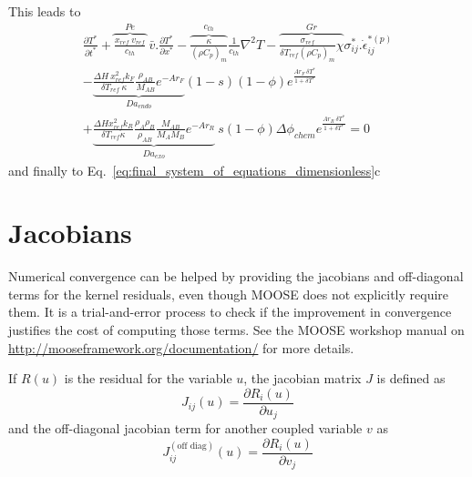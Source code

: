 \documentclass[]{scrreprt}
\newcommand{\moose}{{MOOSE}}
\begin{document}
This leads to 
\begin{multline}
  \label{eq:energy_balance2}
  \frac{\partial T^*}{\partial t^*} + \overbrace{\frac{x_{ref}\:v_{ref}}{c_{th}}}^{Pe}\:\bar{v}.\frac{\partial T^*}{\partial x^*} - \overbrace{\frac{\kappa}{(\rho C_p)_m}}^{c_{th}}\frac{1}{c_{th}} \nabla^2 T - \overbrace{\frac{\sigma_{ref}}{\delta T_{ref}(\rho C_p)_m} \chi}^{Gr} \sigma^*_{ij}.\dot{\epsilon}^{*(p)}_{ij} \\
  - \underbrace{\frac{\Delta H\:x^2_{ref} k_F }{\delta T_{ref}\:\kappa}\frac{\rho_{AB}}{M_{AB}}e^{-Ar_F}}_{Da_{endo}} (1 - s)(1 - \phi)e^{\frac{Ar_F\:\delta T^*}{1+\delta T^*}} \\
   + \underbrace{\frac{\Delta H x^2_{ref} k_R}{\delta T_{ref}\kappa} \frac{\rho_{A} \rho_{B}}{\rho_{AB}} \frac{M_{AB}}{M_A M_B} e^{-Ar_R}}_{Da_{exo}}\:s  (1 - \phi)\Delta \phi_{chem} e^{\frac{Ar_R\:\delta T^*}{1+\delta T^*}}= 0
\end{multline}
and finally to Eq.~\ref{eq:final_system_of_equations_dimensionless}c

\section{Jacobians}
Numerical convergence can be helped by providing the jacobians and off-diagonal terms for the kernel residuals, even though \moose{} does not explicitly require them. It is a trial-and-error process to check if the improvement in convergence justifies the cost of computing those terms. See the \moose{} workshop manual on \url{http://mooseframework.org/documentation/} for more details.


If $R(u)$ is the residual for the variable $u$, the jacobian matrix $J$ is defined as
\begin{equation}
  \label{eq:def_jacobian}
  J_{ij}(u) = \frac{\partial R_i(u)}{\partial u_j}
\end{equation}
and the off-diagonal jacobian term for another coupled variable $v$ as
\begin{equation}
  \label{eq:def_off_diag_jacobian}
  J^{(\text{off diag})}_{ij}(u) = \frac{\partial R_i(u)}{\partial v_j}
\end{equation}
\end{document}
